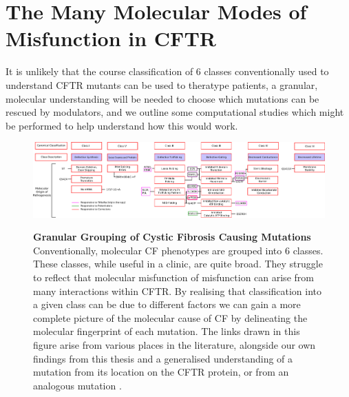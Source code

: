 \section{The Many Molecular Modes of Misfunction in CFTR}
It is unlikely that the course classification of 6 classes conventionally used to understand CFTR mutants can be used to theratype patients, a granular, molecular understanding will be needed to choose which mutations can be rescued by modulators, and we outline some computational studies which might be performed to help understand how this would work.

\begin{landscape}
\begin{figure}
	\begin{center}
	\includegraphics[width=1.5\textwidth]{figures/perspective/classes_mutations.pdf}\\
	\end{center}
	\captionsetup{singlelinecheck = false, justification=raggedright}
	\caption[Granular grouping of CF pathogenesis]{\textbf{Granular Grouping of Cystic Fibrosis Causing Mutations}{ Conventionally, molecular CF phenotypes are grouped into 6 classes. These classes, while useful in a clinic, are quite broad. They struggle to reflect that molecular misfunction of misfunction can arise from many interactions within CFTR. By realising that classification into a given class can be due to different factors we can gain a more complete picture of the molecular cause of CF by delineating the molecular fingerprint of each mutation. The links drawn in this figure arise from various places in the literature, alongside our own findings from this thesis and a generalised understanding of a mutation from its location on the CFTR protein, or from an analogous mutation \cite{bompadre2007, gong2004, wong2022, vangoor2009, vangoor2014, hoffmann2018, thelin2007, gene2008, trikafta_website, phuan2018, ensinck2022}.}
	}

	\label{granular_classification}
\end{figure}
\end{landscape}


